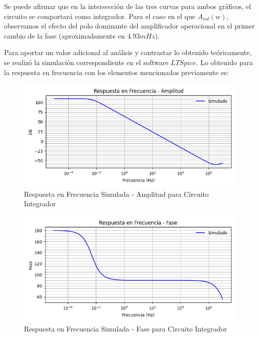 Se puede afirmar que en la intersección de las tres curvas para ambos gráficos, el circuito se comportará como integrador. Para el caso en el que $A_{vol}(w)$, 
observamos el efecto del polo dominante del amplificador operacional en el primer cambio de la fase (aproximadamente en $4.93mHz$). 

Para aportar un valor adicional al análisis y contrastar lo obtenido teóricamente, se realizó la simulación correspondiente en el software $LTSpice$. 
Lo obtenido para la respuesta en frecuencia con los elementos mencionados previamente es:

\begin{figure}[H]
    \centering 
    \includegraphics [scale=0.6] {../Ejercicio3-CircuitoIntegradoresyDerivadores/Imagenes/simulado-integrador-amplitud.png} 
    \caption{Respuesta en Frecuencia Simulada - Amplitud para Circuito Integrador }
    \label{fig:emptyPlotTool}
\end{figure}

\begin{figure}[H]
    \centering 
    \includegraphics [scale=0.6] {../Ejercicio3-CircuitoIntegradoresyDerivadores/Imagenes/simulado-integrador-fase.png} 
    \caption{Respuesta en Frecuencia Simulada - Fase para Circuito Integrador  }
    \label{fig:emptyPlotTool}
\end{figure}

